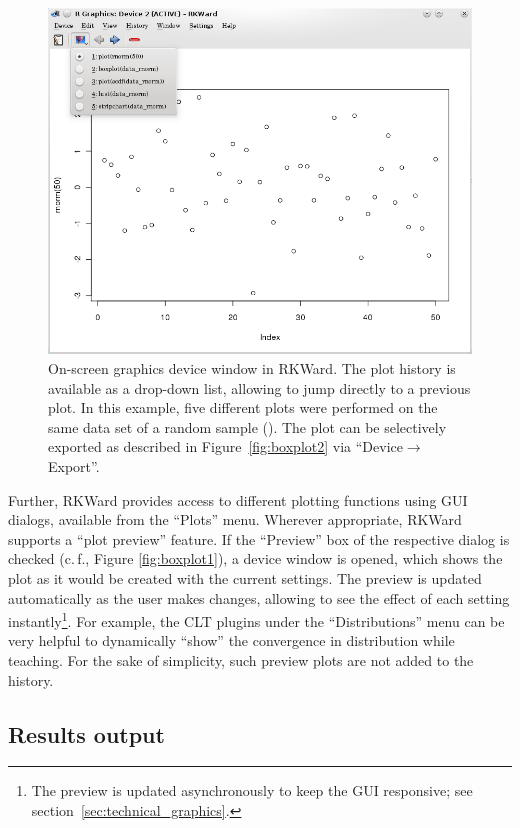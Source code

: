 \begin{figure}[htp]
 \centering
 \includegraphics{../figures/plot_history_cropped.png}
 \caption{On{}-screen graphics device window in RKWard. The plot history is 
  available as a drop-down list, allowing to jump directly to a previous 
  plot. In this example, five different plots were performed on the same data 
  set of a random sample (). The plot can be 
  selectively exported as described in Figure~\ref{fig:boxplot2} via ``Device$\rightarrow$Export''.
}
 \label{fig:plot_history}
\end{figure}

Further, RKWard provides access to different plotting functions using GUI dialogs,
available from the ``Plots'' menu. Wherever appropriate, RKWard supports a ``plot
preview'' feature. If the ``Preview'' box of
the respective dialog is checked (c.\,f., Figure \ref{fig:boxplot1}), a device window is opened, which
shows the plot as it would be created with the current settings. The
preview is updated automatically as the user makes changes, allowing to
see the effect of each setting instantly\footnote{The preview is
updated asynchronously to keep the GUI responsive; see section~\ref{sec:technical_graphics}.}. For example, the CLT plugins
under the ``Distributions'' menu can be very helpful to dynamically ``show''
the convergence in distribution while teaching. For the sake of simplicity, such preview plots are not added to
the history.

\subsection{Results output}
\label{sec:results_output}

